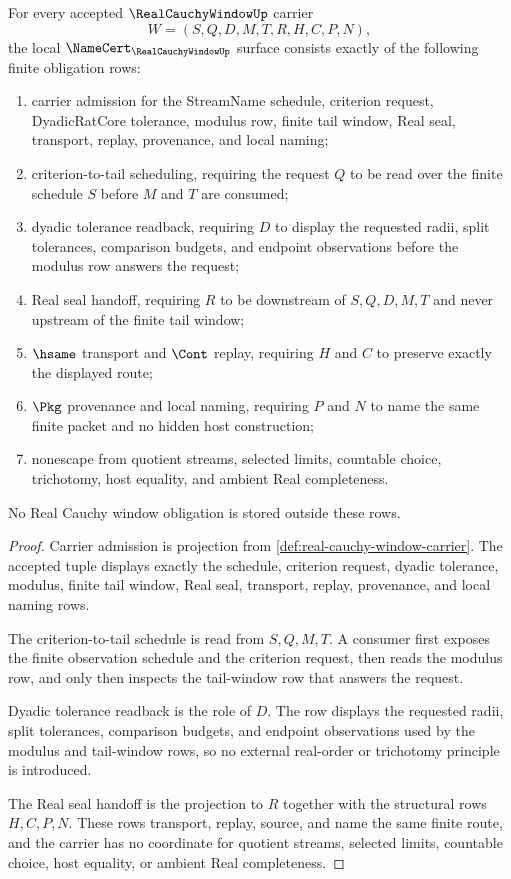 \begin{theorem}
\label{thm:real-cauchy-window-namecert-obligations}
For every accepted $\RealCauchyWindowUp$ carrier
$$
W=(S,Q,D,M,T,R,H,C,P,N),
$$
the local $\NameCert_{\RealCauchyWindowUp}$ surface consists exactly of the following finite obligation rows:
\begin{enumerate}
\item carrier admission for the StreamName schedule, criterion request, DyadicRatCore tolerance, modulus row, finite tail window, Real seal, transport, replay, provenance, and local naming;
\item criterion-to-tail scheduling, requiring the request $Q$ to be read over the finite schedule $S$ before $M$ and $T$ are consumed;
\item dyadic tolerance readback, requiring $D$ to display the requested radii, split tolerances, comparison budgets, and endpoint observations before the modulus row answers the request;
\item Real seal handoff, requiring $R$ to be downstream of $S,Q,D,M,T$ and never upstream of the finite tail window;
\item $\hsame$ transport and $\Cont$ replay, requiring $H$ and $C$ to preserve exactly the displayed route;
\item $\Pkg$ provenance and local naming, requiring $P$ and $N$ to name the same finite packet and no hidden host construction;
\item nonescape from quotient streams, selected limits, countable choice, trichotomy, host equality, and ambient Real completeness.
\end{enumerate}
No Real Cauchy window obligation is stored outside these rows.
\end{theorem}
\begin{proof}
Carrier admission is projection from \autoref{def:real-cauchy-window-carrier}. The accepted tuple displays exactly the schedule, criterion request, dyadic tolerance, modulus, finite tail window, Real seal, transport, replay, provenance, and local naming rows.

The criterion-to-tail schedule is read from $S,Q,M,T$. A consumer first exposes the finite observation schedule and the criterion request, then reads the modulus row, and only then inspects the tail-window row that answers the request.

Dyadic tolerance readback is the role of $D$. The row displays the requested radii, split tolerances, comparison budgets, and endpoint observations used by the modulus and tail-window rows, so no external real-order or trichotomy principle is introduced.

The Real seal handoff is the projection to $R$ together with the structural rows $H,C,P,N$. These rows transport, replay, source, and name the same finite route, and the carrier has no coordinate for quotient streams, selected limits, countable choice, host equality, or ambient Real completeness.
\end{proof}

